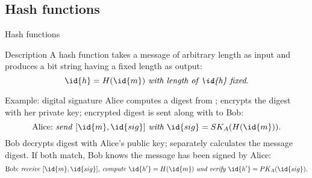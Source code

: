 \subsection{Hash functions}
\begin{slide}{Hash functions}
  \begin{block}{Description}
    A hash function  takes a message  of arbitrary length as input and produces a
    bit string  having a fixed length as output:
    \[
    \id{h} = H(\id{m}) \mbox{\itshape \ with length of \id{h} fixed}.
    \]    
  \end{block}

  \begin{exampleblock}{Example: digital signature}
    Alice computes a digest from ; encrypts the digest with her private key; encrypted digest is sent
    along with  to Bob:
    \[
    \mbox{Alice:\ \emph{send}\ }[\id{m}, \id{sig}]\mbox{\itshape\ with\ }\id{sig} = SK_A(H(\id{m})).
    \]
    Bob decrypts digest with Alice's public key; separately calculates the message digest. If both match, Bob
    knows the message has been signed by Alice:
    \[
    \mbox{Bob:\ \emph{receive}\ }[\id{m}, \id{sig}]\mbox{\itshape,\ compute\ }\id{h^{\prime}} = H(\id{m})
    \mbox{\itshape\ and verify\ }\id{h^{\prime}} = PK_A(\id{sig}).
    \]
  \end{exampleblock}
\end{slide}
